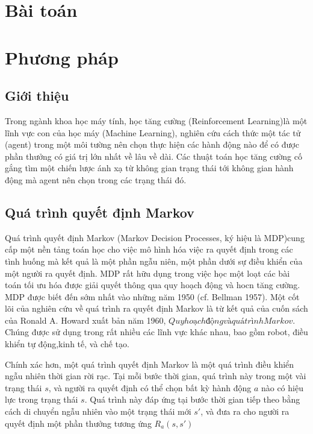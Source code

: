 \documentclass[14pt]{extreport}
\begin{document}
\tableofcontents
\newpage


\newpage
\chapter{Bài toán}
\chapter{Phương pháp}
\section{Giới thiệu}

 Trong ngành khoa học máy tính, học tăng cường (Reinforcement Learning)là một lĩnh vực con của học máy (Machine Learning), nghiên cứu cách thức một tác tử (agent) trong một môi tường nên chọn thực hiện các hành động nào để có được phần thưởng có giá trị lớn nhất về lâu về dài. Các thuật toán học tăng cường cố gắng tìm một chiến lược ánh xạ từ không gian trạng thái tới không gian hành động mà agent nên chọn trong các trạng thái đó.
 
 
\section{Quá trình quyết định Markov}

 Quá trình quyết định Markov (Markov Decision Processes, ký hiệu là MDP)cung cấp một nền tảng toán học cho việc mô hình hóa việc ra quyết định trong các tình huống mà kết quả là một phần ngẫu niên, một phần dưới sự điều khiển của một người ra quyết định. MDP rất hữu dụng trong việc học một loạt các bài toán tối ưu hóa được giải quyết thông qua quy hoạch động và hocn tăng cường. MDP được biết đến sớm nhất vào những năm 1950 (cf. Bellman 1957).  Một cốt lõi của nghiên cứu về quá trình ra quyết định Markov là từ kết quả của cuốn sách của Ronald A. Howard xuất bản năm 1960, $Quy hoạch động và quá trình Markov$. Chúng được sử dụng trong rất nhiều các lĩnh vực khác nhau, bao gồm robot, điều khiển tự động,kinh tế, và chế tạo.
 
 Chính xác hơn, một quá trình quyết định Markov là một quá trình điều khiển ngẫu nhiên thời gian rời rạc. Tại mỗi bước thời gian, quá trình này trong một vài trạng thái $s$, và người ra quyết định có thể chọn bất kỳ hành động $a$ nào có hiệu lực trong trạng thái $s$. Quá trình này đáp ứng tại bước thời gian tiếp theo bằng cách di chuyển ngẫu nhiên vào một trạng thái mới $s'$, và đưa ra cho người ra quyết định một phần thưởng tương ứng $R_a (s,s')$
 
\end{document}
